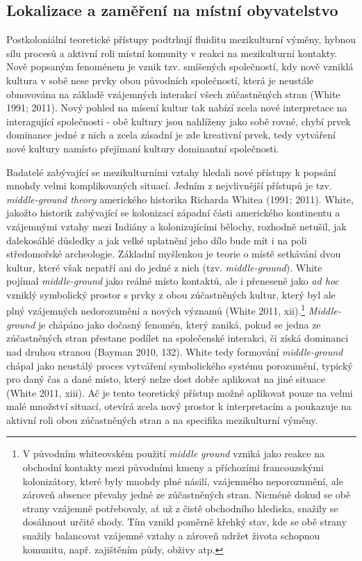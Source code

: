 
\subsection[lokalizace-a-zaměření-na-místní-obyvatelstvo]{Lokalizace a zaměření na místní obyvatelstvo}

Postkoloniální teoretické přístupy podtrhují fluiditu mezikulturní výměny, hybnou sílu procesů a aktivní roli místní komunity v reakci na mezikulturní kontakty. Nově popsaným fenoménem je vznik tzv. smíšených společností, kdy nově vzniklá kultura v sobě nese prvky obou původních společností, která je neustále obnovována na základě vzájemných interakcí všech zúčastněných stran (White 1991; 2011). Nový pohled na mísení kultur tak nabízí zcela nové interpretace na interagující společnosti - obě kultury jsou nahlíženy jako sobě rovné, chybí prvek dominance jedné z nich a zcela zásadní je zde kreativní prvek, tedy vytváření nové kultury namísto přejímaní kultury dominantní společnosti.

Badatelé zabývající se mezikulturními vztahy hledali nové přístupy k popsání mnohdy velmi komplikovaných situací. Jedním z nejvlivnější přístupů je tzv. {\em middle-ground theory} amerického historika Richarda Whitea (1991; 2011). White, jakožto historik zabývající se kolonizací západní části amerického kontinentu a vzájemnými vztahy mezi Indiány a kolonizujícími bělochy, rozhodně netušil, jak dalekosáhlé důsledky a jak velké uplatnění jeho dílo bude mít i na poli středomořské archeologie. Základní myšlenkou je teorie o místě setkávání dvou kultur, které však nepatří ani do jedné z nich (tzv. {\em middle-ground}). White pojímal {\em middle-ground} jako reálné místo kontaktů, ale i přeneseně jako {\em ad hoc} vzniklý symbolický prostor s prvky z obou zúčastněných kultur, který byl ale plný vzájemných nedorozumění a nových významů (White 2011, xii).\footnote{V původním whiteovském použití {\em middle ground} vzniká jako reakce na obchodní kontakty mezi původními kmeny a příchozími francouzskými kolonizátory, které byly mnohdy plné násilí, vzájemného neporozumění, ale zároveň absence převahy jedné ze zúčastněných stran. Nicméně dokud se obě strany vzájemně potřebovaly, ať už z čistě obchodního hlediska, snažily se dosáhnout určité shody. Tím vznikl poměrně křehký stav, kde se obě strany snažily balancovat vzájemné vztahy a zároveň udržet života schopnou komunitu, např. zajištěním půdy, obživy atp.} {\em Middle-ground} je chápáno jako dočasný fenomén, který zaniká, pokud se jedna ze zúčastněných stran přestane podílet na společenské interakci, či získá dominanci nad druhou stranou (Bayman 2010, 132). White tedy formování {\em middle-ground} chápal jako neustálý proces vytváření symbolického systému porozumění, typický pro daný čas a dané místo, který nelze dost dobře aplikovat na jiné situace (White 2011, xiii). Ač je tento teoretický přístup možné aplikovat pouze na velmi malé množství situací, otevírá zcela nový prostor k interpretacím a poukazuje na aktivní roli obou zúčastněných stran a na specifika mezikulturní výměny.

